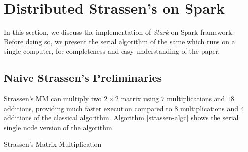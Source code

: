 \section{Distributed Strassen's on Spark}
\label{sec:Distributed-Strassen-Implementation}
In this section, we discuss the implementation of \textit{Stark} on Spark framework. Before doing so, we present the serial algorithm of the same which runs on a single computer, for completeness and easy understanding of the paper.

\subsection{Naive Strassen's Preliminaries}
\label{sec:Strassen-Multiplication-Preliminaries}
Strassen's MM can multiply two $2\times 2$ matrix using $7$ multiplications and $18$ additions, providing much faster execution compared to $8$ multiplications and $4$ additions of the classical algorithm. %
Algorithm \ref{strassen-algo} shows the serial single node version of the algorithm.

\begin{algorithm}
	\SetAlgoLined
	\caption{Strassen's Matrix Multiplication}\label{strassen-algo}
\end{algorithm}


